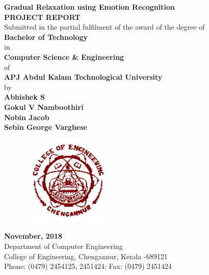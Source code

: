 \documentclass[a4paper,12pt,oneside]{article}
\begin{document}
\thispagestyle{empty}
\begin{center}
\vspace*{4mm}
\large{\textbf{Gradual Relaxation using Emotion Recognition}
\setlength{\baselineskip}{1.5\baselineskip}}
\\

\vspace{5mm}
\textbf{PROJECT REPORT}
\\
\vspace{3mm}
Submitted in the partial fulfilment of the award of the degree
of
\vspace{3mm}
\\
\textbf{Bachelor of Technology}
\\
\vspace{3mm}
in
\\
\vspace{3mm}
\textbf{Computer Science \& Engineering}
\\
\vspace{3mm}
of
\\
\vspace{3mm}
\textbf{APJ Abdul Kalam Technological University}
\\
\vspace{3mm}
by
\\
\vspace{3mm}
\textbf{Abhishek S}
\\
\textbf{Gokul V Namboothiri}
\\
\textbf{Nobin Jacob}
\\
\textbf{Sebin George Varghese}
\\
\vspace{5mm}
\begin{figure}[H]
	\centering
	\includegraphics{ceclogo.png}
\end{figure}
\vspace{25mm}
\textbf{November, 2018}
\vspace{8mm}
\\
\vspace{2mm}
Department of Computer Engineering
\\
\vspace{2mm}
College of Engineering, Chengannur, Kerala -689121
\\
\vspace{2mm}
Phone: (0479) 2454125, 2451424; Fax: (0479) 2451424
\\


\end{center}
\end{document}
